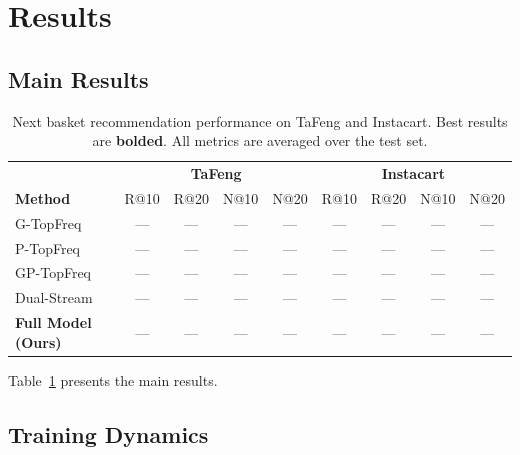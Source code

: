 \documentclass[conference]{IEEEtran}
\begin{document}
\section{Results}
\label{sec:results}

\subsection{Main Results}

\begin{table}[t]
\centering
\caption{Next basket recommendation performance on TaFeng and Instacart. Best results are \textbf{bolded}. All metrics are averaged over the test set.}
\label{tab:main_results}
\begin{tabular}{l|cccc|cccc}
\toprule
& \multicolumn{4}{c|}{\textbf{TaFeng}} & \multicolumn{4}{c}{\textbf{Instacart}} \\
\textbf{Method} & R@10 & R@20 & N@10 & N@20 & R@10 & R@20 & N@10 & N@20 \\
\midrule
G-TopFreq       & --- & --- & --- & --- & --- & --- & --- & --- \\
P-TopFreq       & --- & --- & --- & --- & --- & --- & --- & --- \\
GP-TopFreq      & --- & --- & --- & --- & --- & --- & --- & --- \\
\midrule
Dual-Stream     & --- & --- & --- & --- & --- & --- & --- & --- \\
\textbf{Full Model (Ours)} & --- & --- & --- & --- & --- & --- & --- & --- \\
\bottomrule
\end{tabular}
\end{table}


Table~\ref{tab:main_results} presents the main results.


\subsection{Training Dynamics}
\end{document}

